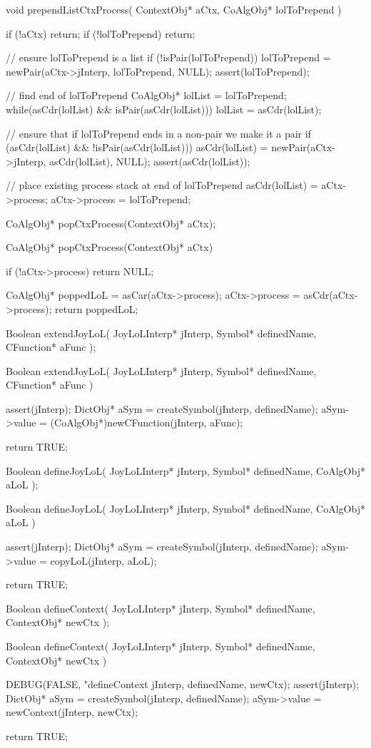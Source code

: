 \startCCode
void prependListCtxProcess(
  ContextObj* aCtx,
  CoAlgObj* lolToPrepend
) {
  if (!aCtx) return;
  if (!lolToPrepend) return;

  // ensure lolToPrepend is a list
  if (!isPair(lolToPrepend)) {
    lolToPrepend = newPair(aCtx->jInterp, lolToPrepend, NULL);
    assert(lolToPrepend);
  }

  // find end of lolToPrepend
  CoAlgObj* lolList = lolToPrepend;
  while(asCdr(lolList) && isPair(asCdr(lolList))) {
    lolList = asCdr(lolList);
  }

  // ensure that if lolToPrepend ends in a non-pair we make it a pair
  if (asCdr(lolList) && !isPair(asCdr(lolList))) {
    asCdr(lolList) = newPair(aCtx->jInterp, asCdr(lolList), NULL);
    assert(asCdr(lolList));
  }

  // place existing process stack at end of lolToPrepend
  asCdr(lolList)  = aCtx->process;
  aCtx->process   = lolToPrepend;
}
\stopCCode

\startCHeader
CoAlgObj* popCtxProcess(ContextObj* aCtx);
\stopCHeader

\startCCode
CoAlgObj* popCtxProcess(ContextObj* aCtx) {
  if (!aCtx->process) return NULL;

  CoAlgObj* poppedLoL = asCar(aCtx->process);
  aCtx->process       = asCdr(aCtx->process);
  return poppedLoL;
}
\stopCCode

\startCHeader
Boolean extendJoyLoL(
  JoyLoLInterp* jInterp,
  Symbol* definedName,
  CFunction* aFunc
);
\stopCHeader

\startCCode
Boolean extendJoyLoL(
  JoyLoLInterp* jInterp,
  Symbol* definedName,
  CFunction* aFunc
) {
  assert(jInterp);
  DictObj* aSym =
    createSymbol(jInterp, definedName);
  aSym->value =
    (CoAlgObj*)newCFunction(jInterp, aFunc);

  return TRUE;
}
\stopCCode

\startCHeader
Boolean defineJoyLoL(
  JoyLoLInterp* jInterp,
  Symbol* definedName,
  CoAlgObj* aLoL
);
\stopCHeader

\startCCode
Boolean defineJoyLoL(
  JoyLoLInterp* jInterp,
  Symbol* definedName,
  CoAlgObj* aLoL
) {
  assert(jInterp);
  DictObj* aSym =
    createSymbol(jInterp, definedName);
  aSym->value = copyLoL(jInterp, aLoL);

  return TRUE;
}
\stopCCode

\starttyping
\startCHeader
Boolean defineContext(
  JoyLoLInterp* jInterp,
  Symbol* definedName,
  ContextObj* newCtx
);
\stopCHeader

\startCCode
Boolean defineContext(
  JoyLoLInterp* jInterp,
  Symbol* definedName,
  ContextObj* newCtx
) {
  DEBUG(FALSE, "defineContext %
        jInterp, definedName, newCtx);
  assert(jInterp);
  DictObj* aSym =
    createSymbol(jInterp, definedName);
  aSym->value   = newContext(jInterp, newCtx);

  return TRUE;
}
\stopCCode
\stoptyping